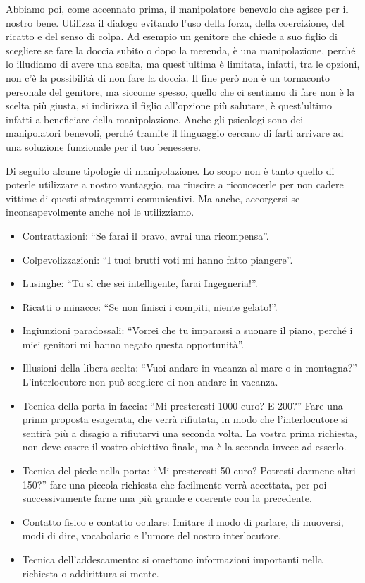 \documentclass[12pt]{book} %
\begin{document}
Abbiamo poi, come accennato prima, il manipolatore benevolo che agisce per il nostro bene. Utilizza il dialogo evitando
l'uso della forza, della coercizione, del ricatto e del senso di colpa. Ad esempio un genitore che
chiede a suo figlio di scegliere se fare la doccia subito o dopo la merenda, è una manipolazione, perché lo illudiamo
di avere una scelta, ma quest'ultima è limitata, infatti, tra le opzioni, non
c'è la possibilità di non fare la doccia. Il fine però non è un tornaconto personale del genitore,
ma siccome spesso, quello che ci sentiamo di fare non è la scelta più giusta, si indirizza il figlio
all'opzione più salutare, è quest'ultimo infatti a beneficiare della
manipolazione. Anche gli psicologi sono dei manipolatori benevoli, perché tramite il linguaggio cercano di farti
arrivare ad una soluzione funzionale per il tuo benessere.

Di seguito alcune tipologie di manipolazione. Lo scopo non è tanto quello di poterle utilizzare a nostro vantaggio, ma
riuscire a riconoscerle per non cadere vittime di questi stratagemmi comunicativi. Ma anche, accorgersi se
inconsapevolmente anche noi le utilizziamo.

\begin{itemize}
\item Contrattazioni: “Se farai il bravo, avrai una ricompensa”. 
\item Colpevolizzazioni: “I tuoi brutti voti mi hanno fatto piangere”. 
\item Lusinghe: “Tu sì che sei intelligente, farai Ingegneria!”. 
\item Ricatti o minacce: “Se non finisci i compiti, niente gelato!”. 
\item Ingiunzioni paradossali: “Vorrei che tu imparassi a suonare il piano, perché i miei genitori mi hanno negato questa opportunità”. 
\item Illusioni della libera scelta: “Vuoi andare in vacanza al mare o in montagna?”
L'interlocutore non può scegliere di non andare in vacanza.
\item Tecnica della porta in faccia: “Mi presteresti 1000 euro? E 200?” Fare una prima proposta esagerata, che verrà
rifiutata, in modo che l'interlocutore si sentirà più a disagio a rifiutarvi una seconda volta. La
vostra prima richiesta, non deve essere il vostro obiettivo finale, ma è la seconda invece ad esserlo.
\item Tecnica del piede nella porta: “Mi presteresti 50 euro? Potresti darmene altri 150?” fare una piccola richiesta
che facilmente verrà accettata, per poi successivamente farne una più grande e coerente con la precedente.
\item Contatto fisico e contatto oculare: Imitare il modo di parlare, di muoversi, modi di dire, vocabolario e l'umore del nostro interlocutore.
\item Tecnica dell'addescamento: si omettono informazioni importanti nella richiesta o addirittura si mente.
\end{itemize}
\end{document}
